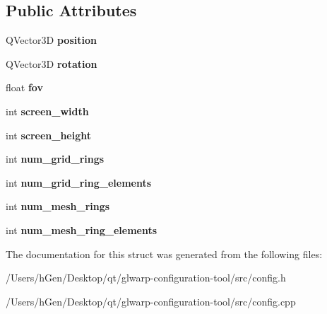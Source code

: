 \subsection*{Public Attributes}
\begin{DoxyCompactItemize}
\item 
\mbox{\label{struct_dome_projector_config_af5c5dd95ae20706d1fcf4d6a127cb7ab}} 
Q\+Vector3D {\bfseries position}
\item 
\mbox{\label{struct_dome_projector_config_ad5a86b3c2b1cf2483f4439f543c29d40}} 
Q\+Vector3D {\bfseries rotation}
\item 
\mbox{\label{struct_dome_projector_config_a036a018d258a937798f75250d5fc5efd}} 
float {\bfseries fov}
\item 
\mbox{\label{struct_dome_projector_config_aefb4e3ec8b8cd2899791e7260eece342}} 
int {\bfseries screen\+\_\+width}
\item 
\mbox{\label{struct_dome_projector_config_a18b6efba3fdecacb70a2a452fb83d137}} 
int {\bfseries screen\+\_\+height}
\item 
\mbox{\label{struct_dome_projector_config_a4a571d42c0e027764e1ed29b7e7a4981}} 
int {\bfseries num\+\_\+grid\+\_\+rings}
\item 
\mbox{\label{struct_dome_projector_config_a9fed455ab623d8a23fe9b6c0f4657d7f}} 
int {\bfseries num\+\_\+grid\+\_\+ring\+\_\+elements}
\item 
\mbox{\label{struct_dome_projector_config_aea8bf159f1e43b10fca1e25d9db2ec5b}} 
int {\bfseries num\+\_\+mesh\+\_\+rings}
\item 
\mbox{\label{struct_dome_projector_config_aab153e6f541c89b2130022ea2f79ab0b}} 
int {\bfseries num\+\_\+mesh\+\_\+ring\+\_\+elements}
\end{DoxyCompactItemize}


The documentation for this struct was generated from the following files\+:\begin{DoxyCompactItemize}
\item 
/\+Users/h\+Gen/\+Desktop/qt/glwarp-\/configuration-\/tool/src/config.\+h\item 
/\+Users/h\+Gen/\+Desktop/qt/glwarp-\/configuration-\/tool/src/config.\+cpp\end{DoxyCompactItemize}
